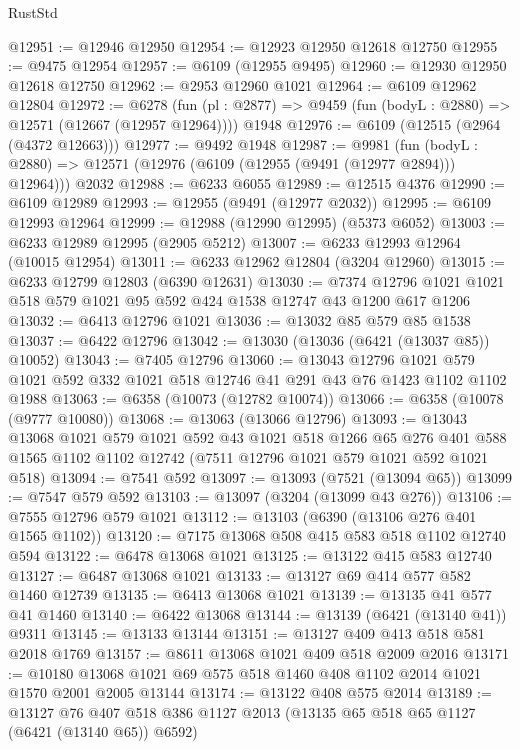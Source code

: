 \begin{lexlean}{RustStd}
\begin{coremodule}
@12951 := @12946 @12950
@12954 := @12923 @12950 @12618 @12750
@12955 := @9475 @12954
@12957 := @6109 (@12955 @9495)
@12960 := @12930 @12950 @12618 @12750
@12962 := @2953 @12960 @1021
@12964 := @6109 @12962 @12804
@12972 := @6278
    (fun (pl : @2877) => @9459 (fun (bodyL : @2880) => @12571 (@12667 (@12957 @12964))))
    @1948
@12976 := @6109 (@12515 (@2964 (@4372 @12663)))
@12977 := @9492 @1948
@12987 := @9981
    (fun (bodyL : @2880) => @12571 (@12976 (@6109 (@12955 (@9491 (@12977 @2894))) @12964)))
    @2032
@12988 := @6233 @6055
@12989 := @12515 @4376
@12990 := @6109 @12989
@12993 := @12955 (@9491 (@12977 @2032))
@12995 := @6109 @12993 @12964
@12999 := @12988 (@12990 @12995) (@5373 @6052)
@13003 := @6233 @12989 @12995 (@2905 @5212)
@13007 := @6233 @12993 @12964 (@10015 @12954)
@13011 := @6233 @12962 @12804 (@3204 @12960)
@13015 := @6233 @12799 @12803 (@6390 @12631)
@13030 := @7374 @12796 @1021 @1021 @518 @579 @1021 @95 @592 @424 @1538 @12747 @43 @1200 @617 @1206
@13032 := @6413 @12796 @1021
@13036 := @13032 @85 @579 @85 @1538
@13037 := @6422 @12796
@13042 := @13030 (@13036 (@6421 (@13037 @85)) @10052)
@13043 := @7405 @12796
@13060 := @13043
    @12796
    @1021
    @579
    @1021
    @592
    @332
    @1021
    @518
    @12746
    @41
    @291
    @43
    @76
    @1423
    @1102
    @1102
    @1988
@13063 := @6358 (@10073 (@12782 @10074))
@13066 := @6358 (@10078 (@9777 @10080))
@13068 := @13063 (@13066 @12796)
@13093 := @13043
    @13068
    @1021
    @579
    @1021
    @592
    @43
    @1021
    @518
    @1266
    @65
    @276
    @401
    @588
    @1565
    @1102
    @1102
    @12742
    (@7511 @12796 @1021 @579 @1021 @592 @1021 @518)
@13094 := @7541 @592
@13097 := @13093 (@7521 (@13094 @65))
@13099 := @7547 @579 @592
@13103 := @13097 (@3204 (@13099 @43 @276))
@13106 := @7555 @12796 @579 @1021
@13112 := @13103 (@6390 (@13106 @276 @401 @1565 @1102))
@13120 := @7175 @13068 @508 @415 @583 @518 @1102 @12740 @594
@13122 := @6478 @13068 @1021
@13125 := @13122 @415 @583 @12740
@13127 := @6487 @13068 @1021
@13133 := @13127 @69 @414 @577 @582 @1460 @12739
@13135 := @6413 @13068 @1021
@13139 := @13135 @41 @577 @41 @1460
@13140 := @6422 @13068
@13144 := @13139 (@6421 (@13140 @41)) @9311
@13145 := @13133 @13144
@13151 := @13127 @409 @413 @518 @581 @2018 @1769
@13157 := @8611 @13068 @1021 @409 @518 @2009 @2016
@13171 := @10180 @13068 @1021 @69 @575 @518 @1460 @408 @1102 @2014 @1021 @1570 @2001 @2005 @13144
@13174 := @13122 @408 @575 @2014
@13189 := @13127
    @76
    @407
    @518
    @386
    @1127
    @2013
    (@13135 @65 @518 @65 @1127 (@6421 (@13140 @65)) @6592)

\end{coremodule}
\end{lexlean}

